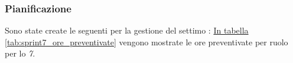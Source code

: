 \subsubsection{Pianificazione}
\label{sec:sprint7_pianificazione}
Sono state create le seguenti  per la gestione del settimo : 
\hyperref[tab:sprint7_ore_preventivate]{In tabella \ref{tab:sprint7_ore_preventivate}} vengono mostrate le ore preventivate per ruolo per lo \textit{ 7}.

\begin{table}[H]
    \centering
    \caption{Ore preventivate per ruolo Sprint 7}
    \label{tab:sprint7_ore_preventivate}
\end{table}